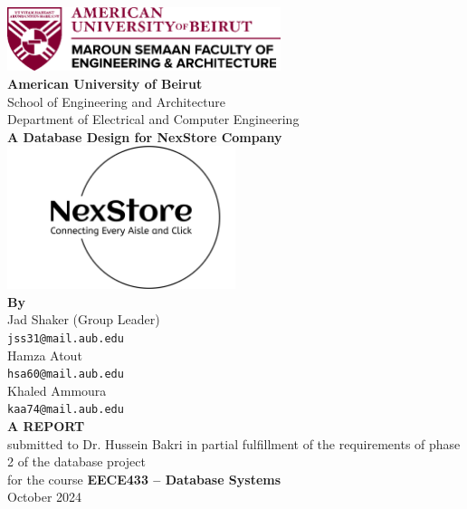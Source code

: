 \documentclass[11pt]{article}
\begin{document}
\onehalfspacing

\begin{center}
  \includegraphics[width=0.6\textwidth]{images/AUB-MSFEA.png} \\[1cm]
  
  \LARGE \textbf{American University of Beirut} \\
  \Large School of Engineering and Architecture \\
  \Large Department of Electrical and Computer Engineering \\
  \huge \textbf{A Database Design for NexStore Company} \\[1cm]
  
  \includegraphics[width=0.5\textwidth]{images/logo.png} \\[1cm]
  
  \Large \textbf{By} \\
  \large Jad Shaker (Group Leader) \\
  \texttt{jss31@mail.aub.edu} \\
  Hamza Atout \\
  \texttt{hsa60@mail.aub.edu} \\
  Khaled Ammoura \\
  \texttt{kaa74@mail.aub.edu} \\[1cm]
  
  \Large \textbf{A REPORT} \\
  submitted to Dr. Hussein Bakri in partial fulfillment of the requirements of phase 2 of the database project \\
  for the course \textbf{EECE433 -- Database Systems} \\[1cm]
  
  \large October 2024
\end{center}

\newpage

\tableofcontents
\end{document}

